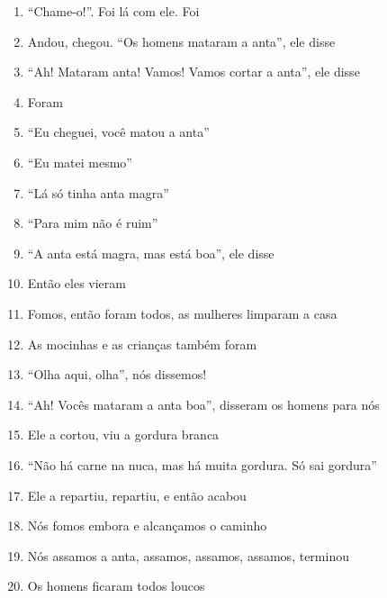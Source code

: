 \begin{enumerate}
 \item ``Chame-o!''. Foi lá com ele. Foi

 \item Andou, chegou. ``Os homens mataram a anta'', ele disse

 \item ``Ah! Mataram anta! Vamos! Vamos cortar a anta'', ele disse

 \item Foram

 \item ``Eu cheguei, você matou a anta''

 \item ``Eu matei mesmo''

 \item ``Lá só tinha anta magra''

 \item ``Para mim não é ruim''

 \item ``A anta está magra, mas está boa'', ele disse

 \begin{center}\end{center}

 \item Então eles vieram

 \item Fomos, então foram todos, as mulheres limparam a casa

 \item As mocinhas e as crianças também foram

 \item ``Olha aqui, olha'', nós dissemos!

 \item ``Ah! Vocês mataram a anta boa'', disseram os homens para nós

 \item Ele a cortou, viu a gordura branca

 \item ``Não há carne na nuca, mas há muita gordura. Só sai gordura''

 \item Ele a repartiu, repartiu, e então acabou

 \item Nós fomos embora e alcançamos o caminho

 \item Nós assamos a anta, assamos, assamos, assamos, terminou

 \item Os homens ficaram todos loucos


\end{enumerate}
